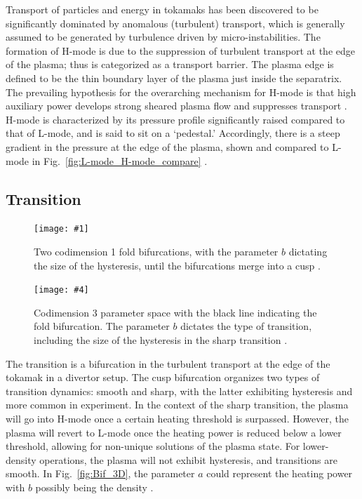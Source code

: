 \documentclass[a4paper]{article}
\newcommand\TwoFig[6]{%
	\sbox\IBoxA{\texttt{[image: \#1]}}
	\sbox\IBoxB{\texttt{[image: \#4]}}%
	\ifdim\ht\IBoxA>\ht\IBoxB
		\setlength\IHeight{\ht\IBoxB}%
	\else\setlength\IHeight{\ht\IBoxA}\fi
	\begin{figure}[tb]
		\minipage[t]{0.45\textwidth}\centering
			\texttt{[image: \#1]}
			\caption{#2}\label{#3}
		\endminipage\hfill
		\minipage[t]{0.45\textwidth}\centering
			\texttt{[image: \#4]}
			\caption{#5}\label{#6}
		\endminipage
	\end{figure}%
}
\begin{document}
Transport of particles and energy in tokamaks has been discovered to be significantly dominated by anomalous (turbulent) transport, which is generally assumed to be generated by turbulence driven by micro-instabilities.
The formation of H-mode is due to the suppression of turbulent transport at the edge of the plasma; thus is categorized as a transport barrier.
The plasma edge is defined to be the thin boundary layer of the plasma just inside the separatrix.
The prevailing hypothesis for the overarching mechanism for H-mode is that high auxiliary power develops strong sheared plasma flow and suppresses transport \cite{freidberg_plasma_2007}.
H-mode is characterized by its pressure profile significantly raised compared to that of L-mode, and is said to sit on a `pedestal.'
Accordingly, there is a steep gradient in the pressure at the edge of the plasma, shown and compared to L-mode in Fig.~\ref{fig:L-mode_H-mode_compare} \cite{weymiens_bifurcation_2014}.


\subsection{Transition}
\TwoFig{../../Graphics/Bif_3D.png}
	{Two codimension 1 fold bifurcations, with the parameter $b$ dictating the size of the hysteresis, until the bifurcations merge into a cusp \cite{weymiens_bifurcation_2014}.}
	{fig:Bif_3D}
	{../../Graphics/3_transitions_single_simple.png}
	{Codimension 3 parameter space with the black line indicating the fold bifurcation. The parameter $b$ dictates the type of transition, including the size of the hysteresis in the sharp transition \cite{weymiens_bifurcation_2014}.}
	{fig:Bif_types}

The transition is a bifurcation in the turbulent transport at the edge of the tokamak in a divertor setup.
The cusp bifurcation organizes two types of transition dynamics: smooth and sharp, with the latter exhibiting hysteresis and more common in experiment.
In the context of the sharp transition, the plasma will go into H-mode once a certain heating threshold is surpassed.
However, the plasma will revert to L-mode once the heating power is reduced below a lower threshold, allowing for non-unique solutions of the plasma state.
For lower-density operations, the plasma will not exhibit hysteresis, and transitions are smooth.
In Fig.~\ref{fig:Bif_3D}, the parameter $a$ could represent the heating power with $b$ possibly being the density \cite{weymiens_bifurcation_2014}.
\end{document}
